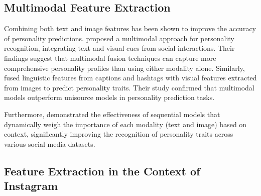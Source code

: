 \begin{comment}
To discuss the comparison between different image feature extraction, \citet{Qawasmeh_Oh_Kwigizile_2025} has provided a number of results according to the feature. For the feature "Road Type", AlexNet was proven to have the highest mean accuracy (84\%) and mean F-score (84\%) among VGG-19 and ResNet50. For the feature "Intersection Angle", AlexNet still holds the highest mean accuracy (85\%), and the highest mean F-score (84\%). \citet{Qiu_Lu_Wang_Chen_Chen_Yang_2024}'s study about image recognition of tomato leaf diseases had modified AlexNet model to fit the number of types of tomato leaf images. It beat the original AlexNet model modelled from \citet{Krizhevsky_Sutskever_Hinton_2017}, which has the accuracy of 87\%, recall of 93.24\%, precision of 92.57\% and F-score of 92.90\%. The modified AlexNet from \citet{Qiu_Lu_Wang_Chen_Chen_Yang_2024} has the highest accuracy of 98.72\%, recall of 98.91\%, precision of 99.77\% and F-score of 99.34\%.
\end{comment}

\subsection{Multimodal Feature Extraction}

Combining both text and image features has been shown to improve the accuracy of personality predictions. \citet{batrinca_multimodal_2016} proposed a multimodal approach for personality recognition, integrating text and visual cues from social interactions. Their findings suggest that multimodal fusion techniques can capture more comprehensive personality profiles than using either modality alone. Similarly, \citet{Skowron2016} fused linguistic features from captions and hashtags with visual features extracted from images to predict personality traits. Their study confirmed that multimodal models outperform unisource models in personality prediction tasks.

Furthermore, \citet{Lima2022} demonstrated the effectiveness of sequential models that dynamically weigh the importance of each modality (text and image) based on context, significantly improving the recognition of personality traits across various social media datasets.

\subsection{Feature Extraction in the Context of Instagram}

